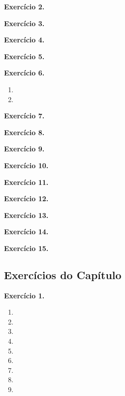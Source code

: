 \documentclass[12pt,a4paper]{article}
\begin{document}
\vspace{0.5cm}
\noindent\textbf{Exercício 2.}

\vspace{0.5cm}
\noindent\textbf{Exercício 3.}

\vspace{0.5cm}
\noindent\textbf{Exercício 4.}

\vspace{0.5cm}
\noindent\textbf{Exercício 5.}

\vspace{0.5cm}
\noindent\textbf{Exercício 6.}
\begin{enumerate}
    \renewcommand{\theenumi}{\alph{enumi}}
    \renewcommand{\labelenumi}{\theenumi)}
    \item 
    \item 
\end{enumerate}

\vspace{0.5cm}
\noindent\textbf{Exercício 7.}

\vspace{0.5cm}
\noindent\textbf{Exercício 8.}

\vspace{0.5cm}
\noindent\textbf{Exercício 9.}

\vspace{0.5cm}
\noindent\textbf{Exercício 10.}

\vspace{0.5cm}
\noindent\textbf{Exercício 11.}

\vspace{0.5cm}
\noindent\textbf{Exercício 12.}

\vspace{0.5cm}
\noindent\textbf{Exercício 13.}

\vspace{0.5cm}
\noindent\textbf{Exercício 14.}

\vspace{0.5cm}
\noindent\textbf{Exercício 15.}

\subsection{Exercícios do Capítulo}

\vspace{0.5cm}
\noindent\textbf{Exercício 1.}
\begin{enumerate}
    \renewcommand{\theenumi}{\alph{enumi}}
    \renewcommand{\labelenumi}{\theenumi)}
    \item 
    \item 
    \item 
    \item 
    \item 
    \item 
    \item 
    \item 
    \item 
\end{enumerate}
\end{document}
